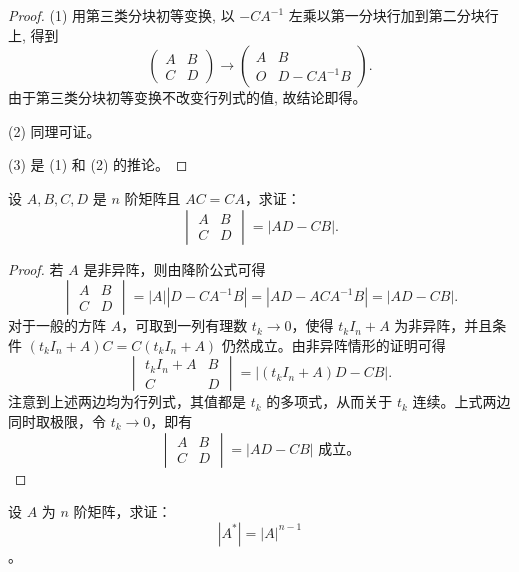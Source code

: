 \documentclass[lang=cn,12pt]{elegantbook}
\begin{document}
    \begin{proof}
    (1) 用第三类分块初等变换, 以 \(-CA^{-1}\) 左乘以第一分块行加到第二分块行上, 得到  
    \[
    \begin{pmatrix}
    A & B \\
    C & D
    \end{pmatrix} \to 
    \begin{pmatrix}
    A & B \\
    O & D - CA^{-1}B
    \end{pmatrix}.
    \]
    由于第三类分块初等变换不改变行列式的值, 故结论即得。
    
    (2) 同理可证。
    
    (3) 是 (1) 和 (2) 的推论。
\end{proof}

\begin{example}
    设 \( A, B, C, D \) 是 \( n \) 阶矩阵且 \( AC = CA \)，求证：
    \[
    \begin{vmatrix}
    A & B \\
    C & D
    \end{vmatrix} = |AD - CB|.
    \]
    \end{example}
    
    \begin{proof}
    若 \( A \) 是非异阵，则由降阶公式可得
    \[
    \begin{vmatrix}
    A & B \\
    C & D
    \end{vmatrix} = |A||D - CA^{-1}B| = |AD - ACA^{-1}B| = |AD - CB|.
    \]
    对于一般的方阵 \( A \)，可取到一列有理数 \( t_k \to 0 \)，使得 \( t_k I_n + A \) 为非异阵，并且条件 \((t_k I_n + A)C = C(t_k I_n + A)\) 仍然成立。由非异阵情形的证明可得
    \[
    \begin{vmatrix}
    t_k I_n + A & B \\
    C & D
    \end{vmatrix} = |(t_k I_n + A)D - CB|.
    \]
    注意到上述两边均为行列式，其值都是 \( t_k \) 的多项式，从而关于 \( t_k \) 连续。上式两边同时取极限，令 \( t_k \to 0 \)，即有
    \[
    \begin{vmatrix}
    A & B \\
    C & D
    \end{vmatrix} = |AD - CB| \text{ 成立。}
    \]
\end{proof}

\begin{example}
    设 \( A \) 为 \( n \) 阶矩阵，求证：\[ |A^*| = |A|^{n-1} \]。
\end{example}
    
\end{document}
